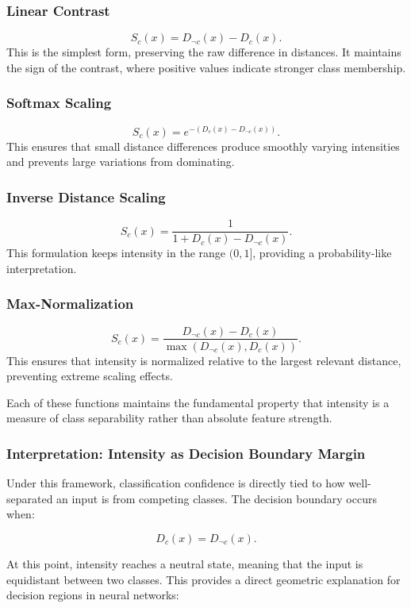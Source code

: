 \documentclass[12pt]{article}
\begin{document}
\subsubsection{Linear Contrast}
\[
S_c(x) = D_{\neg c}(x) - D_c(x).
\]
This is the simplest form, preserving the raw difference in distances. It maintains the sign of the contrast, where positive values indicate stronger class membership.

\subsubsection{Softmax Scaling}
\[
S_c(x) = e^{-(D_c(x) - D_{\neg c}(x))}.
\]
This ensures that small distance differences produce smoothly varying intensities and prevents large variations from dominating.

\subsubsection{Inverse Distance Scaling}
\[
S_c(x) = \frac{1}{1 + D_c(x) - D_{\neg c}(x)}.
\]
This formulation keeps intensity in the range \( (0,1] \), providing a probability-like interpretation.

\subsubsection{Max-Normalization}
\[
S_c(x) = \frac{D_{\neg c}(x) - D_c(x)}{\max(D_{\neg c}(x), D_c(x))}.
\]
This ensures that intensity is normalized relative to the largest relevant distance, preventing extreme scaling effects.

Each of these functions maintains the fundamental property that intensity is a measure of class separability rather than absolute feature strength.

\subsubsection{Interpretation: Intensity as Decision Boundary Margin}

Under this framework, classification confidence is directly tied to how well-separated an input is from competing classes. The decision boundary occurs when:

\[
D_c(x) = D_{\neg c}(x).
\]

At this point, intensity reaches a neutral state, meaning that the input is equidistant between two classes. This provides a direct geometric explanation for decision regions in neural networks: 
\end{document}

